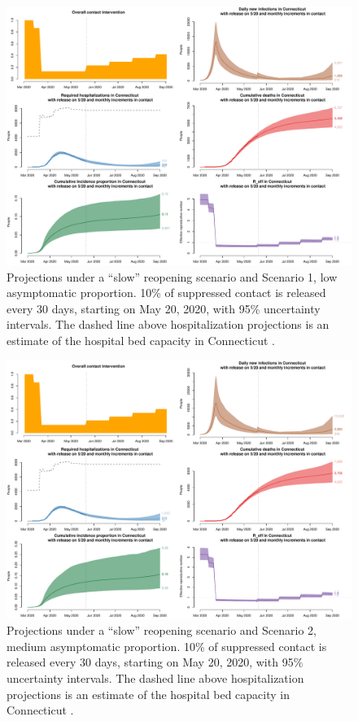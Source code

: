 \documentclass[11pt]{article}
\begin{document}
\begin{figure} %
	\centering
	\includegraphics[width=.9\textwidth]{figures/slow_low_full.pdf}
	\caption{Projections under a ``slow'' reopening scenario and Scenario 1, low asymptomatic proportion. 10\% of suppressed contact is released every 30 days, starting on May 20, 2020, with 95\% uncertainty intervals. The dashed line above hospitalization projections is an estimate of the hospital bed capacity in Connecticut \citep{CHAwebsite}. }
	\label{fig:slow_low}
\end{figure}

\begin{figure} %
	\centering
	\includegraphics[width=.9\textwidth]{figures/slow_medium_full.pdf}
	\caption{Projections under a ``slow'' reopening scenario and Scenario 2, medium asymptomatic proportion. 10\% of suppressed contact is released every 30 days, starting on May 20, 2020, with 95\% uncertainty intervals. The dashed line above hospitalization projections is an estimate of the hospital bed capacity in Connecticut \citep{CHAwebsite}. }
	\label{fig:slow_medium}
\end{figure}
\end{document}
